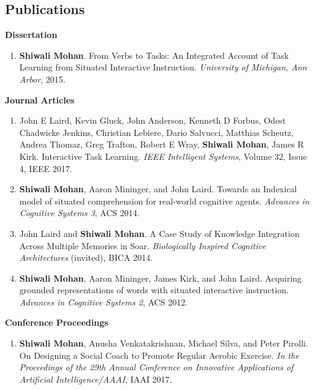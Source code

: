 \documentclass[margin,line,11pt]{res}
\begin{document}
\begin{resume}
                  \section{\sc Publications}
                  \textbf{Dissertation}
                  \begin{enumerate}[label=\lbrack D\arabic*\rbrack, leftmargin=*]
                  \item \textbf{Shiwali Mohan}.  From Verbs to Tasks: An Integrated Account of Task Learning from Situated Interactive Instruction. \emph{University of Michigan, Ann Arbor}, 2015.
                  \end{enumerate}
                  \textbf{Journal Articles}
                  \begin{enumerate}[label=\lbrack J\arabic*\rbrack, leftmargin=*]
                  \item John E Laird, Kevin Gluck, John Anderson, Kenneth D Forbus, Odest Chadwicke Jenkins, Christian Lebiere, Dario Salvucci, Matthias Scheutz, Andrea Thomaz, Greg Trafton, Robert E Wray, \textbf{Shiwali Mohan}, James R Kirk. Interactive Task Learning. \emph{IEEE Intelligent Systems}, Volume 32, Issue 4, IEEE 2017. 
                  \item \textbf{Shiwali Mohan}, Aaron Mininger, and John Laird. Towards an Indexical model of situated comprehension for real-world cognitive agents. \emph{Advances in Cognitive Systems 3}, ACS 2014.
                  \item John Laird and \textbf{Shiwali Mohan}. A Case Study of Knowledge Integration Across Multiple Memories in Soar. \emph{Biologically Inspired Cognitive Architectures} (invited), BICA 2014.
                  \item \textbf{Shiwali Mohan}, Aaron Mininger, James Kirk, and John Laird. Acquiring grounded representations of words with situated interactive instruction. \emph{Advances in Cognitive Systems 2}, ACS 2012.
                  \end{enumerate}

                  \textbf{Conference Proceedings}
                  \begin{enumerate}[label=\lbrack C\arabic*\rbrack,leftmargin=*]
                  \item \textbf{Shiwali Mohan}, Anusha Venkatakrishnan, Michael Silva, and Peter Pirolli. On Designing a Social Coach to Promote Regular Aerobic Exercise. \emph{In the Proceedings of the 29th Annual Conference on Innovative Applications of Artificial Intelligence/AAAI}, IAAI 2017.
                   

\end{enumerate}
\end{resume}
\end{document}
